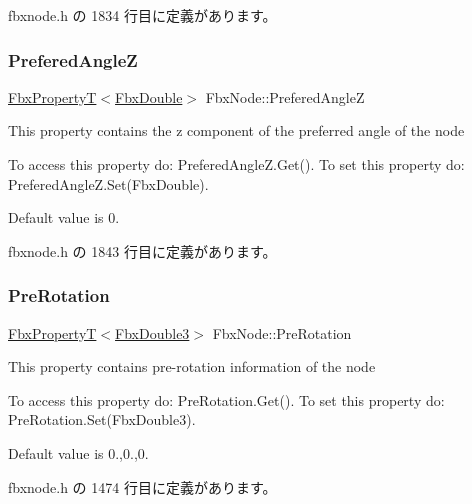  fbxnode.\+h の 1834 行目に定義があります。

\mbox{\label{class_fbx_node_ac046dda87f5e05652e7319a52e89d9f9}} 
\subsubsection{\texorpdfstring{Prefered\+AngleZ}{PreferedAngleZ}}
{\footnotesize\ttfamily \hyperlink{class_fbx_property_t}{Fbx\+PropertyT}$<$\hyperlink{fbxtypes_8h_a171e72a1c46fc15c1a6c9c31948c1c5b}{Fbx\+Double}$>$ Fbx\+Node\+::\+Prefered\+AngleZ}

This property contains the z component of the preferred angle of the node

To access this property do\+: Prefered\+Angle\+Z.\+Get(). To set this property do\+: Prefered\+Angle\+Z.\+Set(\+Fbx\+Double).

Default value is 0. 

 fbxnode.\+h の 1843 行目に定義があります。

\mbox{\label{class_fbx_node_a0e0b6a0097fd99a0f3b6808e741ef23d}} 
\subsubsection{\texorpdfstring{Pre\+Rotation}{PreRotation}}
{\footnotesize\ttfamily \hyperlink{class_fbx_property_t}{Fbx\+PropertyT}$<$\hyperlink{fbxtypes_8h_ae0a96f14cde566774c7553aa7523b7a7}{Fbx\+Double3}$>$ Fbx\+Node\+::\+Pre\+Rotation}

This property contains pre-\/rotation information of the node

To access this property do\+: Pre\+Rotation.\+Get(). To set this property do\+: Pre\+Rotation.\+Set(\+Fbx\+Double3).

Default value is 0.,0.,0. 

 fbxnode.\+h の 1474 行目に定義があります。

\mbox{\label{class_fbx_node_aeeff96aed2eec641d422211a5d13a597}} 
